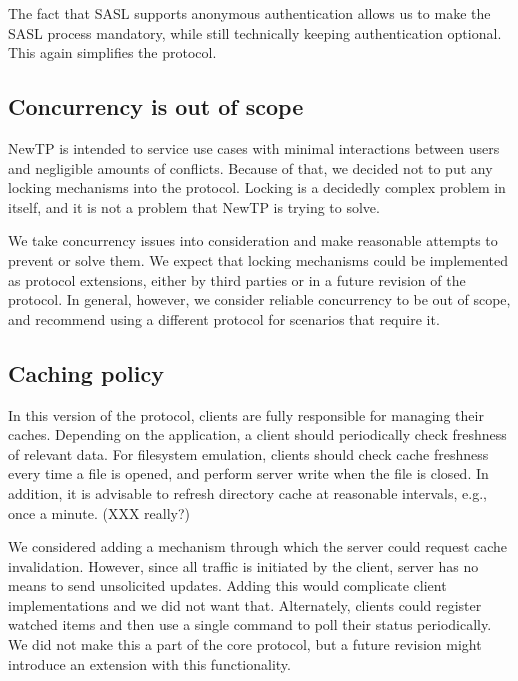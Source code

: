 The fact that SASL supports anonymous authentication allows us to make the SASL process mandatory, while still
technically keeping authentication optional. This again simplifies the protocol.

%

\subsection{Concurrency is out of scope}

NewTP is intended to service use cases with minimal interactions between users and negligible amounts of
conflicts. Because of that, we decided not to put any locking mechanisms into the protocol. Locking is
a decidedly complex problem in itself, and it is not a problem that NewTP is trying to solve.

We take concurrency issues into consideration and make reasonable attempts to prevent or solve them. We expect
that locking mechanisms could be implemented as protocol extensions, either by third parties or in a future
revision of the protocol. In general, however, we consider reliable concurrency to be out of scope, and
recommend using a different protocol for scenarios that require it.

%

\subsection{Caching policy}

In this version of the protocol, clients are fully responsible for managing their caches.  Depending on the
application, a client should periodically check freshness of relevant data.  For filesystem emulation, clients
should check cache freshness every time a file is opened, and perform server write when the file is closed.
In addition, it is advisable to refresh directory cache at reasonable intervals, e.g., once a minute.  (XXX
really?)

We considered adding a mechanism through which the server could request cache invalidation. However, since all
traffic is initiated by the client, server has no means to send unsolicited updates. Adding this would
complicate client implementations and we did not want that. Alternately, clients could register watched items
and then use a single command to poll their status periodically. We did not make this a part of the core
protocol, but a future revision might introduce an extension with this functionality.

